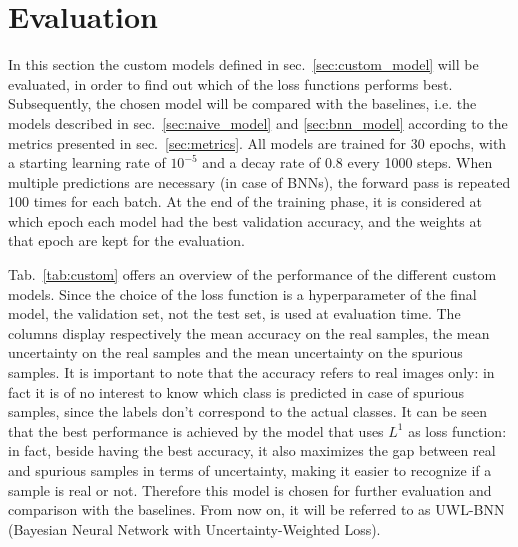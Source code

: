 \documentclass[11pt,twoside,a4paper]{article}
\begin{document}
\section{Evaluation}
\label{sec:evaluation}
In this section the custom models defined in sec.~\ref{sec:custom_model} will be evaluated, in order to find out which of the loss functions performs best. Subsequently, the chosen model will be compared with the baselines, i.e. the models described in sec.~\ref{sec:naive_model} and \ref{sec:bnn_model} according to the metrics presented in sec.~\ref{sec:metrics}. All models are trained for 30 epochs, with a starting learning rate of \(10^{-5}\) and a decay rate of 0.8 every 1000 steps. When multiple predictions are necessary (in case of BNNs), the forward pass is repeated 100 times for each batch. At the end of the training phase, it is considered at which epoch each model had the best validation accuracy, and the weights at that epoch are kept for the evaluation.

Tab.~\ref{tab:custom} offers an overview of the performance of the different custom models. Since the choice of the loss function is a hyperparameter of the final model, the validation set, not the test set, is used at evaluation time. The columns display respectively the mean accuracy on the real samples, the mean uncertainty on the real samples and the mean uncertainty on the spurious samples.
It is important to note that the accuracy refers to real images only: in fact it is of no interest to know which class is predicted in case of spurious samples, since the labels don't correspond to the actual classes.\newline
It can be seen that the best performance is achieved by the model that uses \(L^1\) as loss function: in fact, beside having the best accuracy, it also maximizes the gap between real and spurious samples in terms of uncertainty, making it easier to recognize if a sample is real or not. Therefore this model is chosen for further evaluation and comparison with the baselines. From now on, it will be referred to as UWL-BNN (Bayesian Neural Network with Uncertainty-Weighted Loss).
\end{document}
